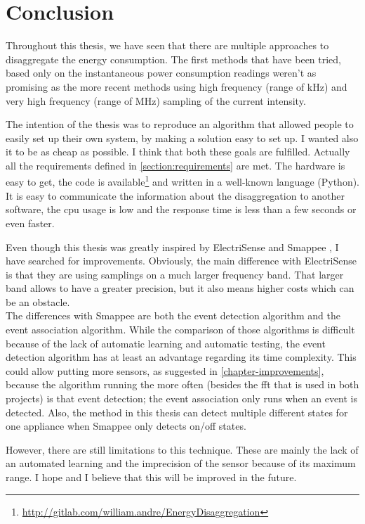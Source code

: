 \chapter{Conclusion}
Throughout this thesis, we have seen that there are multiple approaches to disaggregate the energy consumption. The first methods that have been tried, based only on the instantaneous power consumption readings weren't as promising as the more recent methods using high frequency (range of kHz) and very high frequency (range of MHz) sampling of the current intensity.

The intention of the thesis was to reproduce an algorithm that allowed people to easily set up their own system, by making a solution easy to set up. I wanted also it to be as cheap as possible. I think that both these goals are fulfilled. Actually all the requirements defined in \autoref{section:requirements} are met. The hardware is easy to get, the code is available\footnote{\url{http://gitlab.com/william.andre/EnergyDisaggregation}} and written in a well-known language (Python). It is easy to communicate the information about the disaggregation to another software, the \acrshort{cpu} usage is low and the response time is less than a few seconds or even faster.

Even though this thesis was greatly inspired by ElectriSense \cite{gupta2010electrisense} and Smappee \cite{bruneel2018energy}, I have searched for improvements. Obviously, the main difference with ElectriSense is that they are using samplings on a much larger frequency band. That larger band allows to have a greater precision, but it also means higher costs which can be an obstacle.\\
The differences with Smappee are both the event detection algorithm and the event association algorithm. While the comparison of those algorithms is difficult because of the lack of automatic learning and automatic testing, the event detection algorithm has at least an advantage regarding its time complexity. This could allow putting more sensors, as suggested in \autoref{chapter-improvements}, because the algorithm running the more often (besides the \acrshort{fft} that is used in both projects) is that event detection; the event association only runs when an event is detected. Also, the method in this thesis can detect multiple different states for one appliance when Smappee only detects on/off states.

However, there are still limitations to this technique. These are mainly the lack of an automated learning and the imprecision of the sensor because of its maximum range. I hope and I believe that this will be improved in the future.